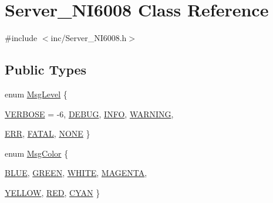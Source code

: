 \hypertarget{classServer__NI6008}{
\section{Server\_\-NI6008 Class Reference}
\label{classServer__NI6008}
}


{\ttfamily \#include $<$inc/Server\_\-NI6008.h$>$}\subsection*{Public Types}
\begin{DoxyCompactItemize}
\item 
enum \hyperlink{classServer__NI6008_af1e3e3bac26355a746b5d2e548fe25be}{MsgLevel} \{ \par
\hyperlink{classServer__NI6008_af1e3e3bac26355a746b5d2e548fe25bea58fcd852dfcff4011a32756eda28852b}{VERBOSE} = -\/6, 
\hyperlink{classServer__NI6008_af1e3e3bac26355a746b5d2e548fe25bead3eef0ad5b826981e274ce214fd3a6d3}{DEBUG}, 
\hyperlink{classServer__NI6008_af1e3e3bac26355a746b5d2e548fe25bea218489470a9743b7d475e86e13ea219d}{INFO}, 
\hyperlink{classServer__NI6008_af1e3e3bac26355a746b5d2e548fe25bead7775b9a40b2a58fe2547fe9c2617093}{WARNING}, 
\par
\hyperlink{classServer__NI6008_af1e3e3bac26355a746b5d2e548fe25bea23728be8768fe4c119fb61ad427ed5ba}{ERR}, 
\hyperlink{classServer__NI6008_af1e3e3bac26355a746b5d2e548fe25bea678aa96ea2189f7d6ab602160fa49b8b}{FATAL}, 
\hyperlink{classServer__NI6008_af1e3e3bac26355a746b5d2e548fe25bea26813832bb3e07669c3f2e68e2b9690e}{NONE}
 \}
\item 
enum \hyperlink{classServer__NI6008_abee9aec1c5054cd3223d4a1e5e4a7ad9}{MsgColor} \{ \par
\hyperlink{classServer__NI6008_abee9aec1c5054cd3223d4a1e5e4a7ad9a87f786fd497d96c2772b919191814893}{BLUE}, 
\hyperlink{classServer__NI6008_abee9aec1c5054cd3223d4a1e5e4a7ad9a68bc466d3117463d6348299d532b2d45}{GREEN}, 
\hyperlink{classServer__NI6008_abee9aec1c5054cd3223d4a1e5e4a7ad9aa89fb8138b784b74e19d3c91a4e57999}{WHITE}, 
\hyperlink{classServer__NI6008_abee9aec1c5054cd3223d4a1e5e4a7ad9a63a33102efe5a43b2004daeb24ac9393}{MAGENTA}, 
\par
\hyperlink{classServer__NI6008_abee9aec1c5054cd3223d4a1e5e4a7ad9a5595845a9cce91475fd2c84dfc0244a1}{YELLOW}, 
\hyperlink{classServer__NI6008_abee9aec1c5054cd3223d4a1e5e4a7ad9ac0ceda8a3474b33193dd1d704d24ecb0}{RED}, 
\hyperlink{classServer__NI6008_abee9aec1c5054cd3223d4a1e5e4a7ad9a17e88e209cae3fc66ebd0ede07ec4431}{CYAN}
 \}
\end{DoxyCompactItemize}

